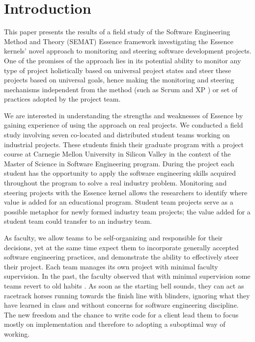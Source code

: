 
\section{Introduction}

This paper presents the results of a field study of the Software Engineering Method and Theory (SEMAT) Essence framework \cite{SEMATKernel, EssenceBook} investigating the Essence kernels' novel approach to monitoring and steering software development projects. One of the promises of the approach lies in its potential ability to monitor any type of project holistically based on universal project states and steer these projects based on universal goals, hence making the monitoring and steering mechanisms independent from the method (such as Scrum \cite{AgileProjectManagement} and XP \cite{ExtremeProgramming2000}) or set of practices adopted by the project team.

We are interested in understanding the strengths and weaknesses of Essence by gaining experience of using the approach on real projects. We conducted a field study involving seven co-located and distributed student teams working on industrial projects. These students finish their graduate program with a project course at Carnegie Mellon University in Silicon Valley in the context of the Master of Science in Software Engineering program. During the project each student has the opportunity to apply the software engineering skills acquired throughout the program to solve a real industry problem. Monitoring and steering projects with the Essence kernel allows the researchers to identify where value is added for an educational program. Student team projects serve as a possible metaphor for newly formed industry team projects; the value added for a student team could transfer to an industry team.

As faculty, we allow teams to be self-organizing and responsible for their decisions, yet at the same time expect them to incorporate generally accepted software engineering practices, and demonstrate the ability to effectively steer their project. Each team manages its own project with minimal faculty supervision. In the past, the faculty observed that with minimal supervision some teams revert to old habits \cite{BareissTransferable}. As soon as the starting bell sounds, they can act as racetrack horses running towards the finish line with blinders, ignoring what they have learned in class and without concerns for software engineering discipline. The new freedom and the chance to write code for a client lead them to focus mostly on implementation and therefore to adopting a suboptimal way of working.

